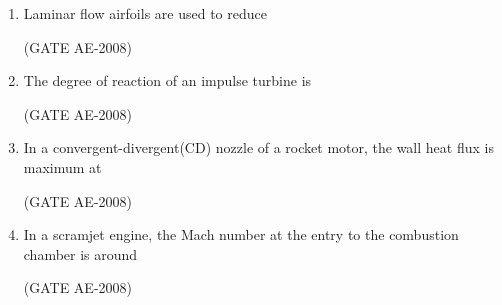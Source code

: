 \documentclass[journal,12pt,onecolumn]{IEEEtran}
\theoremstyle{remark}
\begin{document}
\begin{enumerate}
\quad 

\item Laminar flow airfoils are used to reduce 
\begin{enumerate}
\end{enumerate}
\hfill(GATE AE-2008)

\quad 

\item The degree of reaction of an impulse turbine is 
\begin{enumerate}
\end{enumerate}
\hfill(GATE AE-2008)

\quad 

\item In a convergent-divergent(CD) nozzle of a rocket motor, the wall heat flux is maximum at 
\begin{enumerate}
\end{enumerate}
\hfill(GATE AE-2008)

\quad 

\item In a scramjet engine, the Mach number at the entry to the combustion chamber is around 
\begin{enumerate}
\end{enumerate}
\hfill(GATE AE-2008)


\end{enumerate}
\end{document}
